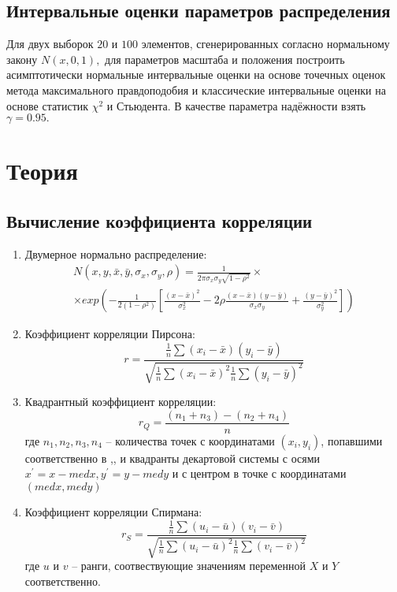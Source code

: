 \documentclass[a4]{article}
\newcommand{\RomanNumeralCaps}[1]
    {\MakeUppercase{\romannumeral #1}}
\begin{document}
\subsection{Интервальные оценки параметров распределения}

Для двух выборок $20$ и $100$ элементов, сгенерированных согласно нормальному закону $N(x,0,1),$ для параметров масштаба и положения построить асимптотически нормальные интервальные оценки на основе точечных оценок метода максимального правдоподобия и классические интервальные оценки на основе статистик $\chi^2$ и Стьюдента. В качестве параметра надёжности взять $\gamma = 0.95.$ 

\section{Теория}

\subsection{Вычисление коэффициента корреляции}

\begin{enumerate}
	\item Двумерное нормально распределение:
	\begin{multline}
	N(x,y,\bar{x},\bar{y},\sigma_{x},\sigma_{y},\rho)=\frac{1}{2\pi\sigma_{x}\sigma_{y}\sqrt{1-\rho^{2}}}\times\\
	\times exp(-\frac{1}{2(1-\rho^{2})}[\frac{(x-\bar{x})^{2}}{\sigma_{x}^{2}}-2\rho\frac{(x-\bar{x})(y-\bar{y})}{\sigma_{x}\sigma_{y}}+\frac{(y-\bar{y})^{2}}{\sigma_{y}^{2}}])
	\end{multline}
	
	\item Коэффициент корреляции Пирсона:
	\begin{equation}
	r=\frac{\frac{1}{n}\sum(x_{i}-\bar{x})(y_{i}-\bar{y})}{\sqrt{\frac{1}{n}\sum(x_{i}-\bar{x})^{2}\frac{1}{n}\sum(y_{i}-\bar{y})^{2}}}
	\end{equation}
	
	\item Квадрантный коэффициент корреляции:
	\begin{equation}
	r_{Q} = \frac{(n_{1} + n_{3}) - (n_{2} + n_{4})}{n}
	\end{equation}
	где $ n_{1},n_{2},n_{3},n_{4} $ -- количества точек с координатами $ (x_{i},y_{i}) $, попавшими соответственно в \RomanNumeralCaps{1},\RomanNumeralCaps{2},\RomanNumeralCaps{3} и \RomanNumeralCaps{4} квадранты декартовой системы с осями $x^{'}=x-med x, y^{'}=y-med y  $ и с центром в точке с координатами$ (med x, med y) $
	\item Коэффициент корреляции Спирмана:
	\begin{equation}
	r_{S}=\frac{\frac{1}{n}\sum(u_{i}-\bar{u})(v_{i}-\bar{v})}{\sqrt{\frac{1}{n}\sum(u_{i}-\bar{u})^{2}\frac{1}{n}\sum(v_{i}-\bar{v})^{2}}}
	\end{equation}
	где $ u $ и $ v $ -- ранги, соотвествующие значениям переменной $X$ и $ Y $ соответственно.
\end{enumerate}
\end{document}
